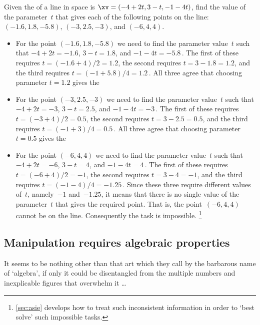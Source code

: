\begin{example} 
Given the  of a line in space is \(\sloppy\xv=(-4+2t,3-t,-1-4t)\), find the value of the parameter~\(t\) that gives each of the following points on the line: \((-1.6,1.8,-5.8)\), \((-3,2.5,-3)\), and \((-6,4,4)\).
\begin{solution} 
\begin{itemize}
\item For the point \((-1.6,1.8,-5.8)\) we need to find the parameter value~\(t\) such that \(-4+2t=-1.6\), \(3-t=1.8\), and \(-1-4t=-5.8\)\,.
The first of these requires \(t=(-1.6+4)/2=1.2\), the second requires \(t=3-1.8=1.2\), and the third requires \(t=(-1+5.8)/4=1.2\)\,.
All three agree that choosing parameter \(t=1.2\) gives the 

\item For the point \((-3,2.5,-3)\) we need to find the parameter value~\(t\) such that \(-4+2t=-3\), \(3-t=2.5\), and \(-1-4t=-3\)\,.
The first of these requires \(t=(-3+4)/2=0.5\), the second requires \(t=3-2.5=0.5\), and the third requires \(t=(-1+3)/4=0.5\)\,.
All three agree that choosing parameter \(t=0.5\) gives the 

\item For the point \((-6,4,4)\) we need to find the parameter value~\(t\) such that \(-4+2t=-6\), \(3-t=4\), and \(-1-4t=4\)\,.
The first of these requires \(t=(-6+4)/2=-1\), the second requires \(t=3-4=-1\), and the third requires \(t=(-1-4)/4=-1.25\)\,.
Since these three require different values of~\(t\), namely~\(-1\) and~\(-1.25\), it means that there is no single value of the parameter~\(t\) that gives the required point.
That is, the point~\((-6,4,4)\) cannot be on the line.
Consequently the task is impossible.%
\footnote{\cref{sec:asie} develops how to treat such inconsistent information in order to `best solve' such impossible tasks.}

\end{itemize}
\end{solution}
\end{example}






\subsection{Manipulation requires algebraic properties}
\label{sec:mrap}

\begin{quoted}{}
It seems to be nothing other than that art which they call by the barbarous name of `algebra', if only it could be disentangled from the multiple numbers and inexplicable figures that overwhelm it \ldots
\end{quoted}

